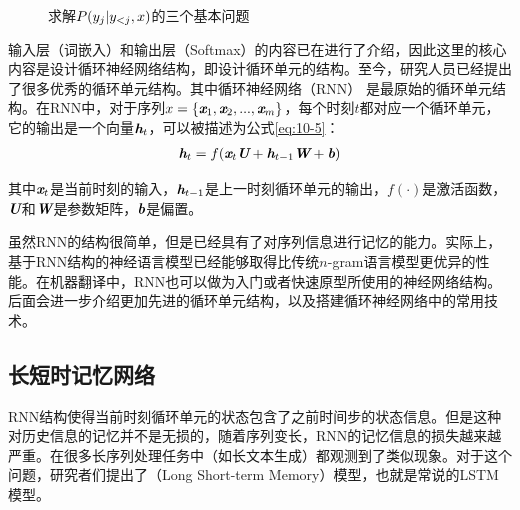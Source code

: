 \begin{figure}[htp]
\centering
 
\caption{求解${P} (y_j | {{y}}_{<j},{{x}})$的三个基本问题}
\label{fig:10-10}
\end{figure}

\parinterval 输入层（词嵌入）和输出层（Softmax）的内容已在{\chapternine}进行了介绍，因此这里的核心内容是设计循环神经网络结构，即设计循环单元的结构。至今，研究人员已经提出了很多优秀的循环单元结构。其中循环神经网络（RNN）
是最原始的循环单元结构。在RNN中，对于序列${{x}}=\{ \textbf{\em x}_1, \textbf{\em x}_2,...,\textbf{\em x}_m \}$，每个时刻$t$都对应一个循环单元，它的输出是一个向量$\textbf{\em h}_t$，可以被描述为公式\eqref{eq:10-5}：
\begin{eqnarray}
\textbf{\em h}_t=f(\textbf{\em x}_t \textbf{\em U}+\textbf{\em h}_{t-1} \textbf{\em W}+\textbf{\em b})
\label{eq:10-5}
\end{eqnarray}

\noindent 其中$\textbf{\em x}_t$是当前时刻的输入，$\textbf{\em h}_{t-1}$是上一时刻循环单元的输出，$f(\cdot)$是激活函数，$\textbf{\em U}$和$\textbf{\em W}$是参数矩阵，$\textbf{\em b}$是偏置。

\parinterval 虽然RNN的结构很简单，但是已经具有了对序列信息进行记忆的能力。实际上，基于RNN结构的神经语言模型已经能够取得比传统$n$-gram语言模型更优异的性能。在机器翻译中，RNN也可以做为入门或者快速原型所使用的神经网络结构。后面会进一步介绍更加先进的循环单元结构，以及搭建循环神经网络中的常用技术。

\vspace{1.5em}
\subsection{长短时记忆网络}
\label{sec:lstm-cell}
\vspace{0.8em}

\parinterval RNN结构使得当前时刻循环单元的状态包含了之前时间步的状态信息。但是这种对历史信息的记忆并不是无损的，随着序列变长，RNN的记忆信息的损失越来越严重。在很多长序列处理任务中（如长文本生成）都观测到了类似现象。对于这个问题，研究者们提出了{\small{}}（Long Short-term Memory）模型，也就是常说的LSTM模型。

